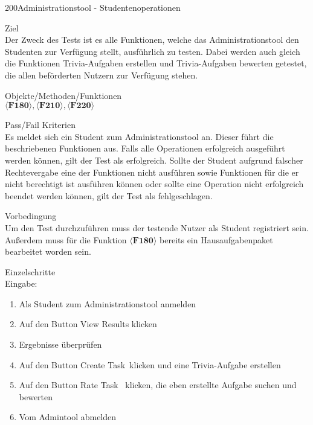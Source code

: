 \begin{testcase}{200}{Administrationstool - Studentenoperationen}

\item[Ziel]~\\
Der Zweck des Tests ist es alle Funktionen, welche das Administrationstool den Studenten zur Verfügung stellt, ausführlich zu testen. Dabei werden auch gleich die Funktionen Trivia-Aufgaben erstellen und Trivia-Aufgaben bewerten getestet, die allen beförderten Nutzern zur Verfügung stehen.

\item[Objekte/Methoden/Funktionen]~\\
$\langle\textbf{F180}\rangle, \langle\textbf{F210}\rangle, \langle\textbf{F220}\rangle$ 

\item[Pass/Fail Kriterien]~\\
Es meldet sich ein Student zum Administrationstool an. Dieser führt die beschriebenen Funktionen aus. Falls alle Operationen erfolgreich ausgeführt werden können, gilt der Test als erfolgreich. Sollte der Student aufgrund falscher Rechtevergabe eine der Funktionen nicht ausführen sowie Funktionen für die er nicht berechtigt ist ausführen können oder sollte eine Operation nicht erfolgreich beendet werden können, gilt der Test als fehlgeschlagen.

\item[Vorbedingung]~\\
Um den Test durchzuführen muss der testende Nutzer als Student registriert sein. Außerdem muss für die Funktion $\langle\textbf{F180}\rangle$ bereits ein Hausaufgabenpaket bearbeitet worden sein.

\item[Einzelschritte]~\\

Eingabe:
\begin{enumerate}
\item Als Student zum Administrationstool anmelden
\item Auf den Button \glqq View Results \grqq klicken
\item Ergebnisse überprüfen
\item Auf den Button \glqq Create Task\grqq~klicken und eine Trivia-Aufgabe erstellen
\item Auf den Button \glqq Rate Task \grqq~klicken, die eben erstellte Aufgabe suchen und bewerten
\item Vom Admintool abmelden
\end{enumerate}



\end{testcase}
